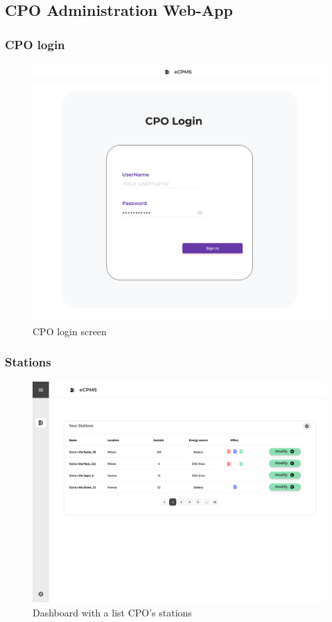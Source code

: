 \subsection{CPO Administration Web-App}

\subsubsection{CPO login}
\begin{center}
    \begin{figure}[H]
        \includegraphics[width=\textwidth]{./img/design/web/login.png}
        \caption{CPO login screen}
    \end{figure}
\end{center}

\subsubsection{Stations}
\begin{center}
    \begin{figure}[H]
        \includegraphics[width=\textwidth]{./img/design/web/home.png}
        \caption{Dashboard with a list CPO's stations}
    \end{figure}
\end{center}

